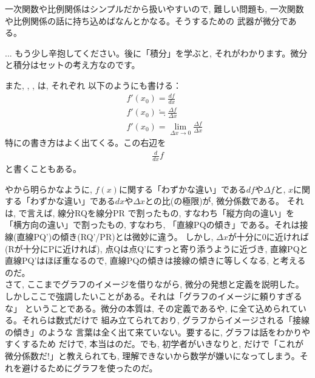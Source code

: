 一次関数や比例関係はシンプルだから扱いやすいので, 難しい問題も, 
一次関数や比例関係の話に持ち込めばなんとかなる。そうするための
武器が微分である。

\begin{faq}{\small{} ... もう少し辛抱してください。後に「積分」を学ぶと, 
それがわかります。微分と積分はセットの考え方なのです。}\end{faq}

また, , , は, それぞれ
以下のようにも書ける：
\begin{eqnarray}
&&f'(x_0)=\frac{df}{dx}\label{eq:define_dif25}\\
&&f'(x_0)\fallingdotseq \frac{\Delta f}{\Delta x}\label{eq:define_dif3}\\
&&f'(x_0)=\lim_{\Delta x \rightarrow 0} \frac{\Delta f}{\Delta x}\label{eq:define_dif4}
\end{eqnarray}
特にの書き方はよく出てくる。この右辺を
\begin{eqnarray}
\frac{d}{dx}f\label{eq:define_dif45}
\end{eqnarray}
と書くこともある。

やから明らかなように, 
$f(x)$に関する「わずかな違い」である$df$や$\Delta f$と, 
$x$に関する「わずかな違い」である$dx$や$\Delta x$との比(の極限)が, 微分係数である。
それは, で言えば, 線分RQを線分PR
で割ったもの, すなわち「縦方向の違い」を「横方向の違い」で割ったもの, すなわち, 
「直線PQの傾き」である。それは接線(直線PQ')の傾き(RQ'/PR)とは微妙に違う。
しかし, $\Delta x$が十分に0に近ければ(Rが十分にPに近ければ), 
点Qは点Q'にすっと寄り添うように近づき, 直線PQと直線PQ'はほぼ重なるので, 
直線PQの傾きは接線の傾きに等しくなる, と考えるのだ。\\

さて, ここまでグラフのイメージを借りながら, 微分の発想と定義を説明した。
しかしここで強調したいことがある。それは「グラフのイメージに頼りすぎるな」
ということである。微分の本質は, その定義であるや, 
に全て込められている。それらは数式だけで
組み立てられており, グラフからイメージされる「接線の傾き」のような
言葉は全く出て来ていない。要するに, グラフは話をわかりやすくするため
だけで, 本当はのだ。でも, 
初学者がいきなりと, 
だけで「これが微分係数だ!」と教えられても, 
理解できないから数学が嫌いになってしまう。それを避けるためにグラフを使ったのだ。

